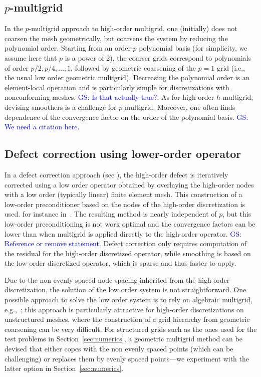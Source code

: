 \documentclass[smallcondensed,final]{svjour3}     %
\newcommand{\gsnote}[1]{\textcolor{blue}{GS: #1}}
\begin{document}
\subsection{$p$-multigrid}\label{subsec:p}
In the $p$-multigrid approach to high-order multigrid, one (initially)
does not coarsen the mesh geometrically, but coarsens the system by
reducing the polynomial order. Starting from an order-$p$ polynomial
basis (for simplicity, we assume here that $p$ is a power of 2), the
coarser grids correspond to polynomials of order $p/2, p/4,\ldots,1$,
followed by geometric coarsening of the $p=1$ grid (i.e., the usual
low order geometric multigrid). Decreasing the polynomial order is an
element-local operation and is particularly simple for discretizations
with nonconforming meshes. \gsnote{Is that actually true?}. As for
high-order $h$-multigrid, devising smoothers is a challenge for
$p$-multigrid.  Moreover, one often finds dependence of the
convergence factor on the order of the polynomial basis. \gsnote{We
  need a citation here.}

\subsection{Defect correction using lower-order operator}\label{subsec:low}
In a defect correction approach (see
\cite{TrottenbergOosterleeSchuller01}), the high-order defect is
iteratively corrected using a low order operator obtained by
overlaying the high-order nodes with a low order (typically linear)
finite element mesh.  This construction of a low-order preconditioner
based on the nodes of the high-order discretization is used. for
instance
in~\cite{Brown10,Kim07,DevilleMund90,HeysManteuffelMcCormickEtAl05}.
The resulting method is nearly independent of $p$, but this low-order
preconditioning is not work optimal and the convergence factors can be
lower than when multigrid is applied directly to the high-order
operator. \gsnote{Reference or remove statement.} Defect correction
only requires computation of the residual for the high-order
discretized operator, while smoothing is based on the low order
discretized operator, which is sparse and thus faster to apply.

Due to the non evenly spaced node spacing inherited from the
high-order discretization, the solution of the low order system is not
straightforward. One possible approach to solve the low order system
is to rely on algebraic multigrid,
e.g.,~\cite{Brown10,HeysManteuffelMcCormickEtAl05}; this approach is
particularly attractive for high-order discretizations on unstructured
meshes, where the construction of a grid hierarchy from geometric
coarsening can be very difficult. For structured grids such as the
ones used for the test problems in Section~\ref{sec:numerics}, a
geometric multigrid method can be devised that either copes with the
non evenly spaced points (which can be challenging) or replaces them
by evenly spaced points---we experiment with the latter option in
Section~\ref{sec:numerics}.
\end{document}

